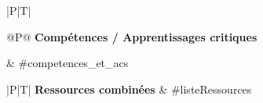 \begin{tabular}[t]{|P|T|}
\hline
    \begin{tabular}[t]{@{}P@{}}
        \bfseries \textcolor{saeC}{Compétences /} \tabularnewline
        \bfseries \textcolor{saeC}{Apprentissages} \tabularnewline
        \bfseries \textcolor{saeC}{critiques}
    \end{tabular}
    &
    #competences_et_acs \\
\hline
\end{tabular}

\begin{tabular}[t]{|P|T|}
\hline
    \textcolor{saeC}{\bfseries Ressources combinées }
    &
    #listeRessources %
    \\
\hline
\end{tabular}




